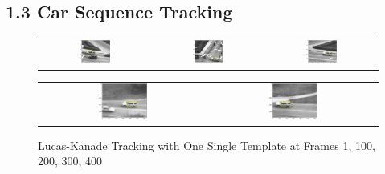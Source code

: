 \documentclass[a4paper]{article}
\begin{document}
\subsection*{1.3 \hspace{4.5} Car Sequence Tracking}
\begin{figure}[!ht]
\centering
\begin{tabular}{ccc}
{\includegraphics[width=0.3\textwidth]{images/carseq_1}} &
{\includegraphics[width=0.3\textwidth]{images/carseq_100}} &
{\includegraphics[width=0.3\textwidth]{images/carseq_200}}
\end{tabular}
\begin{tabular}{cc}
{\includegraphics[width=0.3\textwidth]{images/carseq_300}} &
{\includegraphics[width=0.3\textwidth]{images/carseq_400}}
\end{tabular}
\caption{Lucas-Kanade Tracking with One Single Template at Frames 1, 100, 200, 300, 400}
\end{figure}
\end{document}
